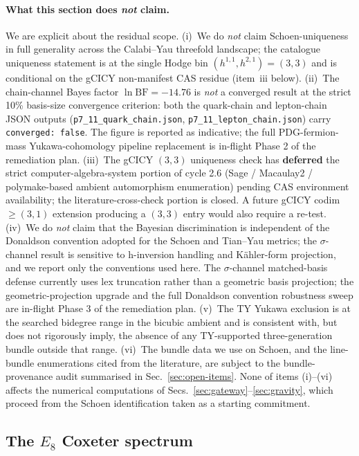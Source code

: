 ﻿\documentclass[reprint,amsmath,amssymb,aps,prd,longbibliography,floatfix]{revtex4-2}
\begin{document}
\paragraph{What this section does \emph{not} claim.}
We are explicit about the residual scope. (i)~We do \emph{not} claim Schoen-uniqueness in full generality across the Calabi--Yau threefold landscape; the catalogue uniqueness statement is at the single Hodge bin $(h^{1,1}, h^{2,1}) = (3,3)$ and is conditional on the gCICY non-manifest CAS residue (item~iii below). (ii)~The chain-channel Bayes factor $\ln \mathrm{BF} = -14.76$ is \emph{not} a converged result at the strict 10\% basis-size convergence criterion: both the quark-chain and lepton-chain JSON outputs (\texttt{p7\_11\_quark\_chain.json}, \texttt{p7\_11\_lepton\_chain.json}) carry \texttt{converged: false}. The figure is reported as indicative; the full PDG-fermion-mass Yukawa-cohomology pipeline replacement is in-flight Phase 2 of the remediation plan. (iii)~The gCICY $(3,3)$ uniqueness check has \textbf{deferred} the strict computer-algebra-system portion of cycle 2.6 (Sage / Macaulay2 / polymake-based ambient automorphism enumeration) pending CAS environment availability; the literature-cross-check portion is closed. A future gCICY codim~$\ge (3,1)$ extension producing a $(3,3)$ entry would also require a re-test. (iv)~We do \emph{not} claim that the Bayesian discrimination is independent of the Donaldson convention adopted for the Schoen and Tian--Yau metrics; the $\sigma$-channel result is sensitive to h-inversion handling and Kähler-form projection, and we report only the conventions used here. The $\sigma$-channel matched-basis defense currently uses lex truncation rather than a geometric basis projection; the geometric-projection upgrade and the full Donaldson convention robustness sweep are in-flight Phase 3 of the remediation plan. (v)~The TY Yukawa exclusion is at the searched bidegree range in the bicubic ambient and is consistent with, but does not rigorously imply, the absence of any TY-supported three-generation bundle outside that range. (vi)~The bundle data we use on Schoen, and the line-bundle enumerations cited from the literature, are subject to the bundle-provenance audit summarised in Sec.~\ref{sec:open-items}. None of items (i)--(vi) affects the numerical computations of Secs.~\ref{sec:gateway}--\ref{sec:gravity}, which proceed from the Schoen identification taken as a starting commitment.

\subsection{The $E_8$ Coxeter spectrum}
\end{document}
